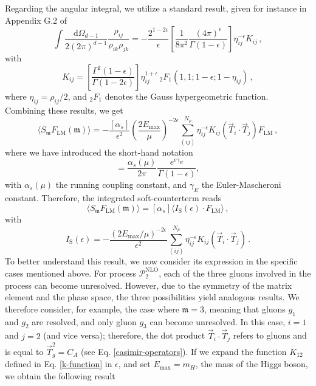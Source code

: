 \documentclass[a4paper, 12pt]{book}
\newcommand{\um}{\mathfrak{m}}
\begin{document}
Regarding the angular integral, we utilize a standard result, given for instance in Appendix G.2 of \cite{Asteriadis:1910}
\begin{equation}
  \int \frac{\mathrm{d}\Omega_{d-1}}{2 (2 \pi)^{d-1}} \frac{\rho_{ij}}{\rho_{ik}\rho_{jk} } = - \frac{2^{1-2\epsilon}}{\epsilon} \left[\frac{1}{8 \pi^2} \frac{(4\pi)^{\epsilon}}{\Gamma(1-\epsilon)}  \right]\eta_{ij}^{-\epsilon} K_{ij} \, ,
\end{equation}
with
\begin{equation}
  K_{ij} = \left[ \frac{\Gamma^2(1-\epsilon)}{\Gamma(1-2\epsilon)}\right] \eta_{ij}^{1+\epsilon} \, {}_2F_1(1,1;1-\epsilon; 1-\eta_{ij}) \, ,
  \label{k-function}
\end{equation}
where $\eta_{ij}=\rho_{ij}/2$, and ${}_2F_1$ denotes the Gauss hypergeometric function. Combining these results, we get 
\begin{equation}
   \langle S_\um F_{\mathrm{LM}} (\um) \rangle = - \frac{[\alpha_s]}{\epsilon^2} \left(\frac{2 E_{\mathrm{max}}}{\mu}\right)^{-2\epsilon} \sum_{(ij)}^{N_p} \eta_{ij}^{-\epsilon}  K_{ij} (\vec{T}_i \cdot \vec{T}_j) F_{\mathrm{LM}} \, ,
   \label{soft-limit}
\end{equation}
where we have introduced the short-hand notation
\begin{equation}
  [\alpha_s]= \frac{\alpha_s(\mu)}{2\pi} \frac{e^{\epsilon \gamma_E}}{\Gamma(1-\epsilon)}, 
\end{equation}
with $\alpha_s(\mu)$ the running coupling constant, and $\gamma_E$ the Euler-Mascheroni constant. Therefore, the integrated soft-counterterm reads
\begin{equation}
  \langle S_\um F_{\mathrm{LM}} (\um) \rangle = [\alpha_s] \langle I_{\mathrm{S}}(\epsilon) \cdot F_{\mathrm{LM}}\rangle \, , 
  \label{soft-regulated}
\end{equation}
with 
\begin{equation}
  I_\mathrm{S}(\epsilon)= - \frac{\left(2E_{\mathrm{max}}/\mu\right)^{-2\epsilon}}{\epsilon^2} \sum_{(ij)}^{N_p} \eta_{ij}^{-\epsilon} K_{ij} (\vec{T}_i \cdot \vec{T}_j) \, .
  \label{I-s-operator}
\end{equation}
To better understand this result, we now consider its expression in the specific cases mentioned above. For process $\mathcal{P}_{2}^{\mathrm{NLO}}$, each of the three gluons involved in the process can become unresolved. However, due to the symmetry of the matrix element and the phase space, the three possibilities yield analogous results. We therefore consider, for example, the case where $\um=3$, meaning that gluons $g_1$ and $g_2$ are resolved, and only gluon $g_3$ can become unresolved. In this case, $i=1$ and $j=2$ (and vice versa); therefore, the dot product $\vec{T}_i \cdot \vec{T}_j$ refers to gluons and is equal to $\vec{T}_g^2 = C_A$ (see Eq. \ref{casimir-operators}). If we expand the function $K_{12}$ defined in Eq. \ref{k-function} in $\epsilon$, and set $E_{\mathrm{max}}=m_H$, the mass of the Higgs boson, we obtain the following result
\end{document}

